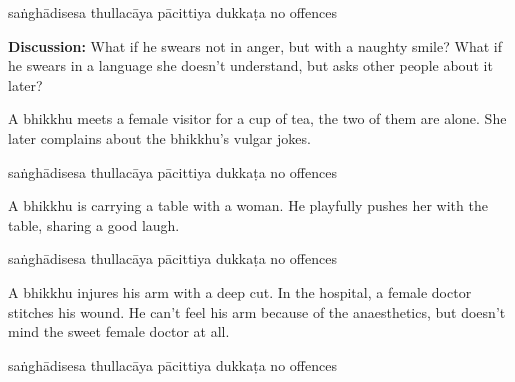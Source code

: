 \begin{exam}{\autoExamName}
\begin{problem*}
\begin{parts}
    \bigskip

    \begin{answers}{5}
      \bChoices
       saṅghādisesa\eAns
       thullacāya\eAns
       pācittiya\eAns
       dukkaṭa\eAns
       no offences\eAns
      \eChoices
    \end{answers}

    \bigskip

    \textbf{Discussion:} What if he swears not in anger, but with a naughty
    smile? What if he swears in a language she doesn't understand, but asks
    other people about it later?

    \bigskip

  \item A bhikkhu meets a female visitor for a cup of tea, the two of them are alone.
    She later complains about the bhikkhu's vulgar jokes.

    \bigskip

    \begin{answers}{5}
      \bChoices
       saṅghādisesa\eAns
       thullacāya\eAns
       pācittiya\eAns
       dukkaṭa\eAns
       no offences\eAns
      \eChoices
    \end{answers}

    \bigskip

  \item A bhikkhu is carrying a table with a woman. He playfully pushes her
    with the table, sharing a good laugh.

    \bigskip

    \begin{answers}{5}
      \bChoices
       saṅghādisesa\eAns
       thullacāya\eAns
       pācittiya\eAns
       dukkaṭa\eAns
       no offences\eAns
      \eChoices
    \end{answers}

    \bigskip

  \item A bhikkhu injures his arm with a deep cut. In the hospital, a female
    doctor stitches his wound. He can't feel his arm because of the
    anaesthetics, but doesn't mind the sweet female doctor at all.

    \bigskip

    \begin{answers}{5}
      \bChoices
       saṅghādisesa\eAns
       thullacāya\eAns
       pācittiya\eAns
       dukkaṭa\eAns
       no offences\eAns
      \eChoices
    \end{answers}


\end{parts}
\end{problem*}
\end{exam}
